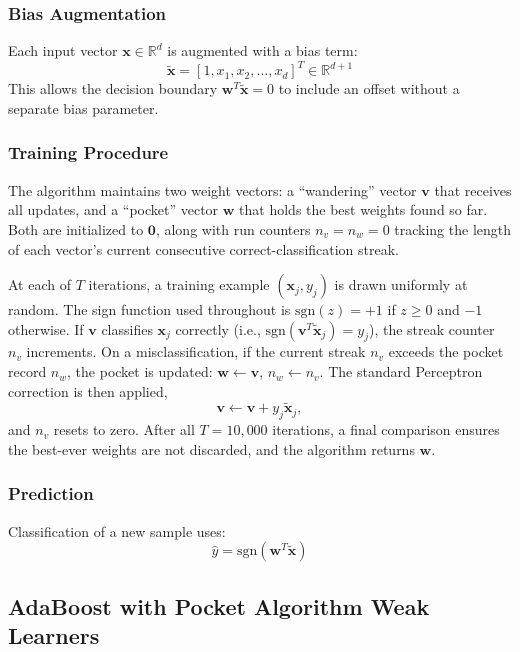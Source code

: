 \documentclass{acm_proc_article-sp}
\begin{document}
\subsubsection{Bias Augmentation}
Each input vector $\mathbf{x} \in \mathbb{R}^d$ is augmented with a bias term:
\begin{equation}
\tilde{\mathbf{x}} = [1, x_1, x_2, \ldots, x_d]^T \in \mathbb{R}^{d+1}
\end{equation}
This allows the decision boundary $\mathbf{w}^T \tilde{\mathbf{x}} = 0$ to include an offset without a separate bias parameter.

\subsubsection{Training Procedure}
The algorithm maintains two weight vectors: a ``wandering'' vector $\mathbf{v}$ that receives all updates, and a ``pocket'' vector $\mathbf{w}$ that holds the best weights found so far. Both are initialized to $\mathbf{0}$, along with run counters $n_v = n_w = 0$ tracking the length of each vector's current consecutive correct-classification streak.

At each of $T$ iterations, a training example $(\mathbf{x}_j, y_j)$ is drawn uniformly at random. The sign function used throughout is $\text{sgn}(z) = +1$ if $z \geq 0$ and $-1$ otherwise. If $\mathbf{v}$ classifies $\mathbf{x}_j$ correctly (i.e., $\text{sgn}(\mathbf{v}^T \tilde{\mathbf{x}}_j) = y_j$), the streak counter $n_v$ increments. On a misclassification, if the current streak $n_v$ exceeds the pocket record $n_w$, the pocket is updated: $\mathbf{w} \leftarrow \mathbf{v}$, $n_w \leftarrow n_v$. The standard Perceptron correction is then applied,
\begin{equation}
\mathbf{v} \leftarrow \mathbf{v} + y_j \tilde{\mathbf{x}}_j,
\end{equation}
and $n_v$ resets to zero. After all $T = 10{,}000$ iterations, a final comparison ensures the best-ever weights are not discarded, and the algorithm returns $\mathbf{w}$.

\subsubsection{Prediction}
Classification of a new sample uses:
\begin{equation}
\hat{y} = \text{sgn}(\mathbf{w}^T \tilde{\mathbf{x}})
\end{equation}

\subsection{AdaBoost with Pocket Algorithm Weak Learners}
\end{document}
